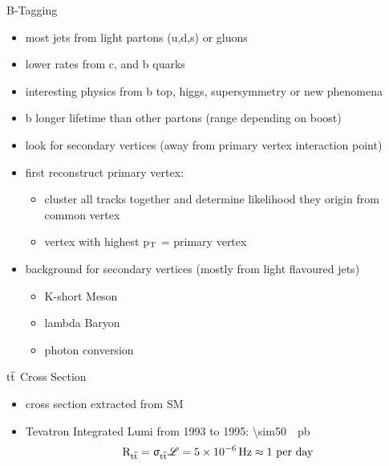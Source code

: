 \begin{frame}{B-Tagging}

	\begin{itemize}\itemfill
		\item most jets from light partons (u,d,s) or gluons
		\item lower rates from c, and b quarks
		\item interesting physics from b \ra top, higgs, supersymmetry or new phenomena
		\item b longer lifetime than other partons (\ra range  depending on boost)
		\item look for secondary vertices (away from primary vertex \ra interaction point)
		\item first reconstruct primary vertex:
		\begin{itemize}
			\item cluster all tracks together and determine likelihood they origin from common vertex
			\item vertex with highest p$_{\text{T}}$ = primary vertex
		\end{itemize}
		
	\end{itemize}
	\begin{minipage}[c][.22\textheight]{.5\textwidth}
		\begin{itemize}
			\item background for secondary vertices (mostly from light flavoured jets)
			\begin{itemize}
				\item K-short Meson
				\item lambda Baryon 
				\item photon conversion 
			\end{itemize}
		\end{itemize}
	\end{minipage}
	\begin{minipage}{.45\textwidth}
	\end{minipage}



\end{frame}
\begin{frame}{$\text{t}\overline{\text{t}}$ Cross Section}

	\vspace*{-10pt}\vspace*{-10pt}
	
	\begin{itemize}\itemfill
		\item cross section extracted from SM
		\item Tevatron Integrated Lumi from 1993 to 1995: \SI{\sim50}{\per\pico\barn}
		\begin{equation*} \text{R}_{\text{t}\overline{\text{t}}} = \upsigma_{\text{t}\overline{\text{t}}}\mathscr{L} = \SI{5e-6}{\hertz} \approx 1 \text{ per day} \end{equation*}

	\end{itemize}

\end{frame}
